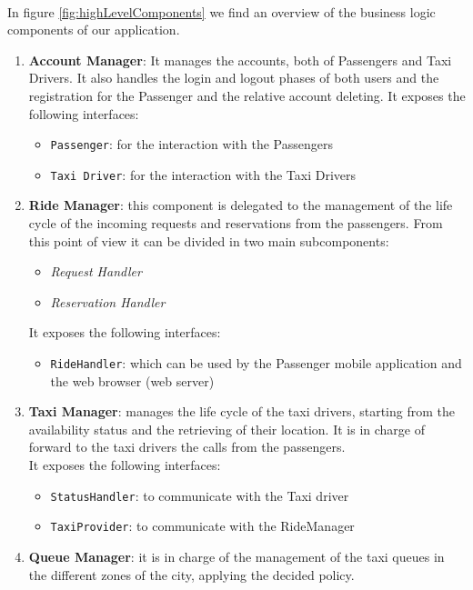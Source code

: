 \paragraph{} In figure \ref{fig:highLevelComponents} we find an overview of the business logic components of our application.
\begin{enumerate}
	\item \textbf{Account Manager}: It manages the accounts, both of Passengers and Taxi Drivers. It also handles the login and logout phases of both users and the registration for the Passenger and the relative account deleting. It exposes the following interfaces:
	\begin{itemize}
		\item \texttt{Passenger}: for the interaction with the Passengers
		\item \texttt{Taxi Driver}: for the interaction with the Taxi Drivers
	\end{itemize}
	\item \textbf{Ride Manager}: this component is delegated to the management of the life cycle of the incoming requests and reservations from the passengers. From this point of view it can be divided in two main subcomponents:
	\begin{itemize}
		\item \textit{Request Handler}
		\item \textit{Reservation Handler}
	\end{itemize}
	It exposes the following interfaces:
	\begin{itemize}
		\item \texttt{RideHandler}: which can be used by the Passenger mobile application and the web browser (web server)
	\end{itemize}
	\item \textbf{Taxi Manager}: manages the life cycle of the taxi drivers, starting from the availability status and the retrieving of their location. It is in charge of forward to the taxi drivers the calls from the passengers.\\ It exposes the following interfaces:
	\begin{itemize}
		\item \texttt{StatusHandler}: to communicate with the Taxi driver
		\item \texttt{TaxiProvider}: to communicate with the RideManager
	\end{itemize}
	\item \textbf{Queue Manager}: it is in charge of the management of the taxi queues in the different zones of the city, applying the decided policy.\\

\end{enumerate}
